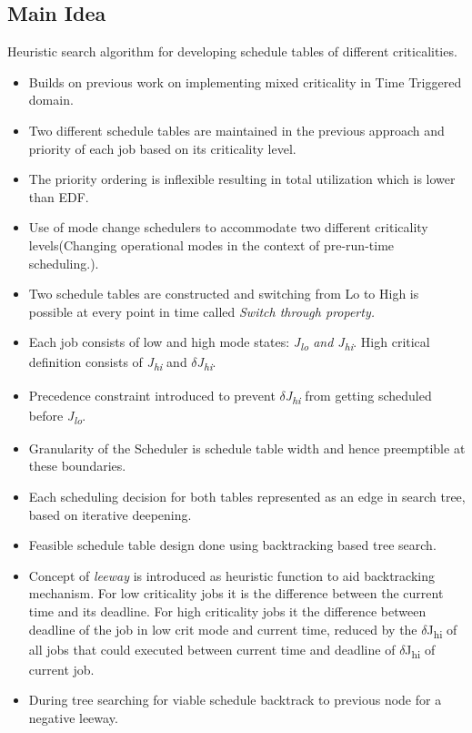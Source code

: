 \subsection*{Main Idea}
Heuristic search algorithm for developing schedule tables of different criticalities.
\begin{itemize}
	\item Builds on previous work on implementing mixed criticality in Time Triggered domain.
	\item Two different schedule tables are maintained in the previous approach and priority of each job based on its criticality level.
	\item The priority ordering is inflexible resulting in total utilization which is lower than EDF.
	\item Use of mode change schedulers to accommodate two different criticality levels(Changing operational modes in the context of pre-run-time scheduling.).
	\item Two schedule tables are constructed and switching from Lo to High is possible at every point in time called \textit{Switch through property.}
	\item Each job consists of low and high mode states: \textit{J\textsubscript{lo} and J\textsubscript{hi}}. High critical definition consists of \textit{J\textsubscript{hi} }and \textit{$\delta$J\textsubscript{hi}}. 
	\item Precedence constraint introduced to prevent \textit{$\delta$J\textsubscript{hi}} from getting scheduled before \textit{J\textsubscript{lo}}.
	\item Granularity of the Scheduler is schedule table width and hence preemptible at these boundaries.
	\item Each scheduling decision for both tables represented as an edge in search tree, based on iterative deepening.
	\item Feasible schedule table design done using backtracking based tree search.
	\item Concept of \textit{leeway} is introduced as heuristic function to aid backtracking mechanism. For low criticality jobs it is the difference between the current time and its deadline. For high criticality jobs it the difference between deadline of the job in low crit mode and current time, reduced by the $\delta$J\textsubscript{hi} of all jobs that could executed between current time and deadline of $\delta$J\textsubscript{hi} of current job.
	\item During tree searching for viable schedule backtrack to previous node for a negative leeway.
			
\end{itemize}
